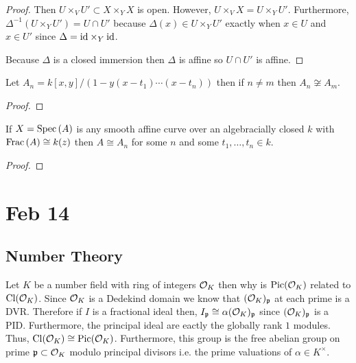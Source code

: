 \documentclass[12pt]{article}
\begin{document}
\begin{proof}
Then $U \times_V U' \subset X \times_Y X$ is open. However, $U \times_V X = U \times_Y U'$. Furthermore, $\Delta^{-1}(U \times_Y U') = U \cap U'$ because $\Delta(x) \in U \times_Y U'$ exactly when $x \in U$ and $x \in U'$ since $\Delta = \mathrm{id} \times_Y \mathrm{id}$.
\begin{center}
\end{center}
Because $\Delta$ is a closed immersion then $\Delta$ is affine so $U \cap U'$ is affine. 
\end{proof}

\begin{proposition}
Let $A_n = k[x,y]/(1 - y(x - t_1) \cdots (x - t_n))$ then if $n \neq m$ then $A_n \not\cong A_m$. 
\end{proposition}

\begin{proof}

\end{proof}

\begin{proposition}
If $X = \mathrm{Spec}\left( A \right)$ is any smooth affine curve over an algebracially closed $k$ with $\mathrm{Frac}\left(A\right) \cong k(z)$ then $A \cong A_n$ for some $n$ and some $t_1, \dots, t_n \in k$.
\end{proposition}

\begin{proof}

\end{proof}

\section{Feb 14}

\subsection{Number Theory}

Let $K$ be a number field with ring of integers $\mathcal{O}_{K}$ then why is $\mathrm{Pic}(\mathcal{O}_{K})$ related to $\mathrm{Cl}(\mathcal{O}_{K})$. Since $\mathcal{O}_{K}$ is a Dedekind domain we know that $(\mathcal{O}_{K})_{\mathfrak{p}}$ at each prime is a DVR. Therefore if $I$ is a fractional ideal then, $I_{\mathfrak{p}} \cong \alpha (\mathcal{O}_{K})_{\mathfrak{p}}$ since $(\mathcal{O}_{K})_{\mathfrak{p}}$ is a PID. Furthermore, the principal ideal are eactly the globally rank $1$ modules. Thus, $\mathrm{Cl}(\mathcal{O}_{K}) \cong \mathrm{Pic}(\mathcal{O}_{K})$. Furthermore, this group is the free abelian group on prime $\mathfrak{p} \subset \mathcal{O}_{K}$ modulo principal divisors i.e. the prime valuations of $\alpha \in K^\times$.
\end{document}
